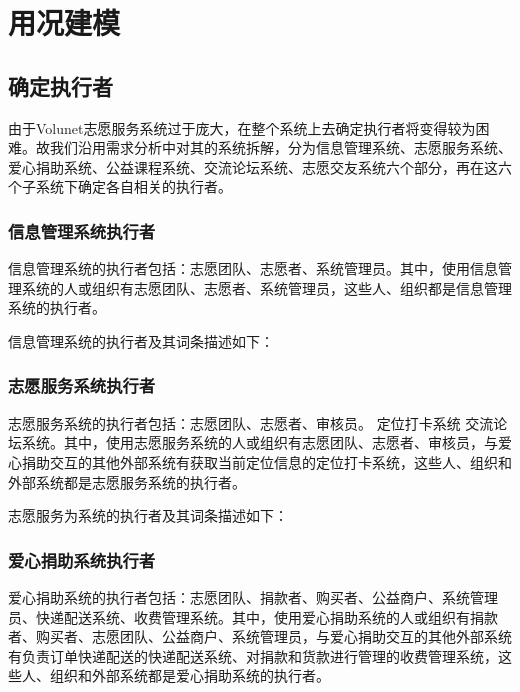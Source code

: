 \section{用况建模}



\subsection{确定执行者}
由于Volunet志愿服务系统过于庞大，在整个系统上去确定执行者将变得较为困难。故我们沿用需求分析中对其的系统拆解，分为信息管理系统、志愿服务系统、爱心捐助系统、公益课程系统、交流论坛系统、志愿交友系统六个部分，再在这六个子系统下确定各自相关的执行者。

\subsubsection{信息管理系统执行者}
信息管理系统的执行者包括：志愿团队、志愿者、系统管理员。其中，使用信息管理系统的人或组织有志愿团队、志愿者、系统管理员，这些人、组织都是信息管理系统的执行者。

信息管理系统的执行者及其词条描述如下：


\subsubsection{志愿服务系统执行者}
志愿服务系统的执行者包括：志愿团队、志愿者、审核员。
定位打卡系统 交流论坛系统。其中，使用志愿服务系统的人或组织有志愿团队、志愿者、审核员，与爱心捐助交互的其他外部系统有获取当前定位信息的定位打卡系统，这些人、组织和外部系统都是志愿服务系统的执行者。

志愿服务为系统的执行者及其词条描述如下：


\subsubsection{爱心捐助系统执行者}


爱心捐助系统的执行者包括：志愿团队、捐款者、购买者、公益商户、系统管理员、快递配送系统、收费管理系统。其中，使用爱心捐助系统的人或组织有捐款者、购买者、志愿团队、公益商户、系统管理员，与爱心捐助交互的其他外部系统有负责订单快递配送的快递配送系统、对捐款和货款进行管理的收费管理系统，这些人、组织和外部系统都是爱心捐助系统的执行者。

